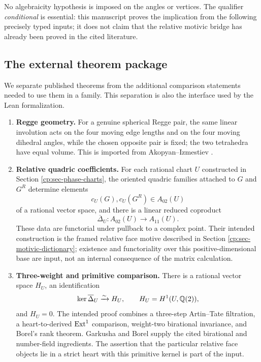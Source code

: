 No algebraicity hypothesis is imposed on the angles or vertices.  The
qualifier \emph{conditional} is essential: this manuscript proves the
implication from the following precisely typed inputs; it does not claim
that the relative motivic bridge has already been proved in the cited
literature.

\subsection{The external theorem package}
\label{cp:subsec-external-contract}

We separate published theorems from the additional comparison statements
needed to use them in a family.  This separation is also the interface used
by the Lean formalization.

\begin{enumerate}[label=\textup{(E\arabic*)},leftmargin=3.1em]
\item \textbf{Regge geometry.}
\label{cp:input-E1}
For a genuine spherical Regge pair, the same linear involution acts on the
four moving edge lengths and on the four moving dihedral angles, while the
chosen opposite pair is fixed; the two tetrahedra have equal volume.  This
is imported from Akopyan--Izmestiev \cite{AkopyanIzmestiev2019}.

\item \textbf{Relative quadric coefficients.}
\label{cp:input-E2}
For each rational chart \(U\) constructed in Section
\ref{cp:sec-phase-charts}, the oriented quadric families attached to
\(G\) and \(G^R\) determine elements
\[
 c_U(G),c_U(G^R)\in A_{02}(U)
\]
of a rational vector space, and there is a linear reduced coproduct
\[
 \overline\Delta_U:A_{02}(U)\longrightarrow A_{11}(U).
\]
These data are functorial under pullback to a complex point.  Their intended
construction is the framed relative face motive described in Section
\ref{cp:sec-motivic-dictionary}; existence and functoriality over this
positive-dimensional base are input, not an internal consequence of the
matrix calculation.

\item \textbf{Three-weight and primitive comparison.}
\label{cp:input-E3}
There is a rational vector space \(H_U\), an identification
\[
 \ker\overline\Delta_U\xrightarrow{\sim}H_U,
 \qquad H_U=H^1(U,\mathbb Q(2)),
\]
and \(H_U=0\).  The intended proof combines a three-step
Artin--Tate filtration, a heart-to-derived \(\operatorname{Ext}^1\) comparison,
weight-two birational invariance, and Borel's rank theorem.  Garkusha
\cite{Garkusha2023} and Borel \cite{Borel1977} supply the cited
birational and number-field ingredients.  The assertion that the particular
relative face objects lie in a strict heart with this primitive kernel is
part of the input.


\end{enumerate}
